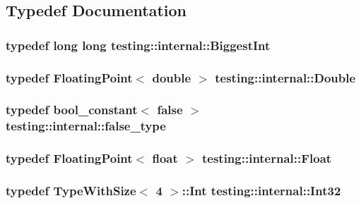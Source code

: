 \subsection{Typedef Documentation}
\hypertarget{namespacetesting_1_1internal_a05c6bd9ede5ccdf25191a590d610dcc6}{
\subsubsection[{Biggest\-Int}]{\setlength{\rightskip}{0pt plus 5cm}typedef long long {\bf testing\-::internal\-::\-Biggest\-Int}}}\label{namespacetesting_1_1internal_a05c6bd9ede5ccdf25191a590d610dcc6}
\hypertarget{namespacetesting_1_1internal_a92debc9f055b7e7e1e4e861c5ae1c67a}{
\subsubsection[{Double}]{\setlength{\rightskip}{0pt plus 5cm}typedef {\bf Floating\-Point}$<$ double $>$ {\bf testing\-::internal\-::\-Double}}}\label{namespacetesting_1_1internal_a92debc9f055b7e7e1e4e861c5ae1c67a}
\hypertarget{namespacetesting_1_1internal_a91e570bc966cc243d784dbb550bbbe7d}{
\subsubsection[{false\-\_\-type}]{\setlength{\rightskip}{0pt plus 5cm}typedef {\bf bool\-\_\-constant}$<$ false $>$ {\bf testing\-::internal\-::false\-\_\-type}}}\label{namespacetesting_1_1internal_a91e570bc966cc243d784dbb550bbbe7d}
\hypertarget{namespacetesting_1_1internal_a97de600d6dbfffe7091b878ac4b3a9a7}{
\subsubsection[{Float}]{\setlength{\rightskip}{0pt plus 5cm}typedef {\bf Floating\-Point}$<$ float $>$ {\bf testing\-::internal\-::\-Float}}}\label{namespacetesting_1_1internal_a97de600d6dbfffe7091b878ac4b3a9a7}
\hypertarget{namespacetesting_1_1internal_af89e21e4043b5cf0c120af487b24fa06}{
\subsubsection[{Int32}]{\setlength{\rightskip}{0pt plus 5cm}typedef {\bf Type\-With\-Size}$<$ 4 $>$\-::Int {\bf testing\-::internal\-::\-Int32}}}\label{namespacetesting_1_1internal_af89e21e4043b5cf0c120af487b24fa06}
